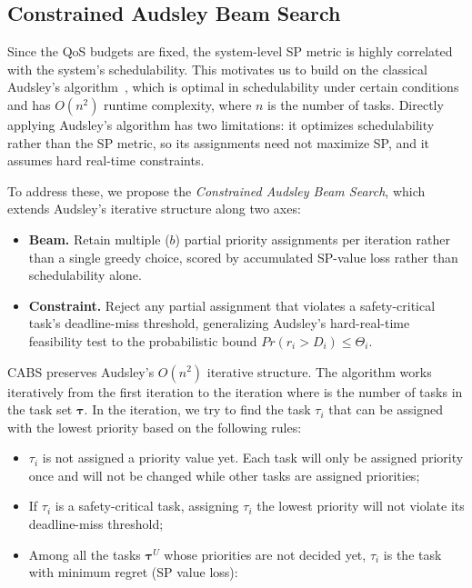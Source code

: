 	\subsection{Constrained Audsley Beam Search}
	\label{section_cabs}
    Since the QoS budgets are fixed, the system-level SP metric is highly correlated with the system's schedulability.
    This motivates us to build on the classical Audsley's algorithm~\cite{Audsley91optimalpriority}, which is optimal in schedulability under certain conditions~\cite{Audsley91optimalpriority} and has $O(n^2)$ runtime complexity, where $n$ is the number of tasks.
    Directly applying Audsley's algorithm has two limitations: it optimizes schedulability rather than the SP metric, so its assignments need not maximize SP, and it assumes hard real-time constraints.

    To address these, we propose the \emph{Constrained Audsley Beam Search}, which extends Audsley's iterative structure along two axes:
    \begin{itemize}
        \item \textbf{Beam.} Retain multiple ($b$) partial priority assignments per iteration rather than a single greedy choice, scored by accumulated SP-value loss rather than schedulability alone.
        \item \textbf{Constraint.} Reject any partial assignment that violates a safety-critical task's deadline-miss threshold, generalizing Audsley's hard-real-time feasibility test to the probabilistic bound $Pr(r_i > D_i) \leq \Theta_i$.
    \end{itemize}
    CABS preserves Audsley's $O(n^2)$ iterative structure.
    The algorithm works iteratively from the first iteration to the  iteration where  is the number of tasks in the task set $\boldsymbol{\tau}$.
    In the  iteration, we try to find the task $\tau_i$ that can be assigned with the  lowest priority based on the following rules:
    \begin{itemize}
        \item $\tau_i$ is not assigned a priority value yet. Each task will only be assigned priority once and will not be changed while other tasks are assigned priorities;
        \item If $\tau_i$ is a safety-critical task, assigning $\tau_i$ the  lowest priority will not violate its deadline-miss threshold;
        \item Among all the tasks $\boldsymbol{\tau}^{U}$ whose priorities are not decided yet, $\tau_i$ is the task with minimum regret (SP value loss):
    \end{itemize}
